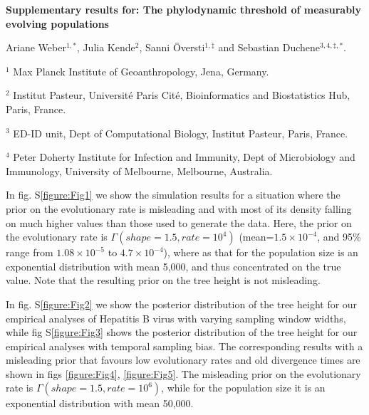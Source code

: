 \documentclass[11pt]{article}
\begin{document}
\begin{flushright}

\end{flushright}
\begin{center}
	\begin{LARGE}
	\textbf{Supplementary results for: The phylodynamic threshold of measurably evolving populations}
	\end{LARGE}


Ariane Weber$^{1,*}$, Julia Kende$^{2}$, Sanni Översti$^{1, \ddagger}$ and Sebastian Duchene$^{3,4,\ddagger, *}$.
\end{center}

$^{1}$ Max Planck Institute of Geoanthropology, Jena, Germany.

$^{2}$ Institut Pasteur, Université Paris Cité, Bioinformatics and Biostatistics Hub, Paris, France.

$^{3}$ ED-ID unit, Dept of Computational Biology, Institut Pasteur, Paris, France.

$^{4}$ Peter Doherty Institute for Infection and Immunity, Dept of Microbiology and Immunology, University of Melbourne, Melbourne, Australia.
\newline

In fig. S\ref{figure:Fig1} we show the simulation results for a situation where the prior on the evolutionary rate is misleading and with most of its density falling on much higher values than those used to generate the data. Here, the prior on the evolutionary rate is $\Gamma(shape=1.5, rate=10^{4})$ (mean=$1.5\times 10^{-4}$, and 95\% range from $1.08 \times 10^{-5}$ to $4.7 \times 10^{-4}$), where as that for the population size is an exponential distribution with mean 5,000, and thus concentrated on the true value. Note that the resulting prior on the tree height is not misleading.

In fig. S\ref{figure:Fig2} we show the posterior distribution of the tree height for our empirical analyses of Hepatitis B virus with varying sampling window widths, while fig S\ref{figure:Fig3} shows the posterior distribution of the tree height for our empirical analyses with temporal sampling bias. The corresponding results with a misleading prior that favours low evolutionary rates and old divergence times are shown in figs \ref{figure:Fig4}, \ref{figure:Fig5}. The misleading prior on the evolutionary rate is $\Gamma(shape=1.5, rate=10^6)$, while for the population size it is an exponential distribution with mean 50,000.
\end{document}
